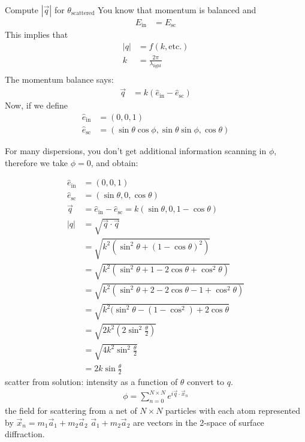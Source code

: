 \documentclass{article}
\newcommand{\norm}[1]{\left|#1\right|}
\newcommand{\ein}[0]{\hat{e}_\text{in}}
\newcommand{\esc}[0]{\hat{e}_\text{sc}}
\begin{document}
\begin{section}{Compute $\norm{\vec{q}}$ for $\theta_\text{scattered}$}
	You know that momentum is balanced and 
	\begin{align*}
		E_\text{in} &= E_\text{sc}
	\end{align*}
	This implies that
	\begin{align*}
		\norm{q} &= f(k,\text{etc.})\\
		k &= \frac{2\pi}{\lambda_\text{light}}\\
	\end{align*}
	The momentum balance says:
	\begin{align*}
		\vec{q} &= k(\ein-\esc)
	\end{align*}
	Now, if we define
	\begin{align*}
		\ein &= (0,0,1)\\
		\esc &= (\sin\theta\cos\phi,\sin\theta\sin\phi,\cos\theta)
	\end{align*}

	For many dispersions, you don't get additional information scanning in $\phi$, therefore we take $\phi=0$, and obtain:

	\begin{align*}
		\ein &= (0,0,1)\\
		\esc &= (\sin\theta,0,\cos\theta)\\
		\vec{q} &= \ein - \esc = k(\sin\theta,0,1-\cos\theta)\\
		\norm{q} &= \sqrt{\vec{q}\cdot\vec{q}}\\
		&= \sqrt{ k^2( \sin^2\theta + (1 - \cos\theta)^2)}\\
		&= \sqrt{ k^2(\sin^2\theta + 1 - 2\cos\theta + \cos^2\theta)}\\
		&= \sqrt{ k^2(\sin^2\theta + 2 - 2\cos\theta - 1 + \cos^2\theta)}\\
		&= \sqrt{ k^2(\sin^2\theta - (1 - \cos^2) + 2\cos\theta}\\
		&= \sqrt{ 2 k^2(2\sin^2\frac{\theta}{2})}\\
		&= \sqrt{ 4k^2\sin^2\frac{\theta}{2}}\\
		&= 2 k \sin\frac{\theta}{2}
	\end{align*}
	scatter from solution: intensity as a function of $\theta$ convert to $q$.
	\begin{align*}
		\phi = \sum_{n=0}^{N\times N}e^{i\vec{q}\cdot\vec{x}_n}
	\end{align*}
	the field for scattering from a net of $N\times N$ particles with each atom represented by $\vec{x}_n = m_1 \vec{a}_1 + m_2\vec{a}_2$ 
	$\vec{a}_1 + m_2\vec{a}_2$ are vectors in the 2-space of surface diffraction.
\end{section}
\end{document}
